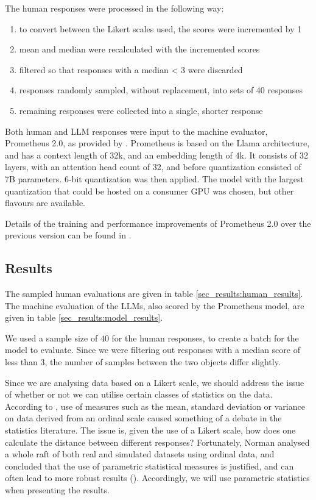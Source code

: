 \documentclass{article}
\begin{document}
The human responses were processed in the following way:

\begin{enumerate}
    \item to convert between the Likert scales used, the scores were incremented by 1
    \item mean and median were recalculated with the incremented scores
    \item filtered so that responses with a median < 3 were discarded
    \item responses randomly sampled, without replacement, into sets of 40 responses
    \item remaining responses were collected into a single, shorter response 
\end{enumerate}

Both human and LLM responses were input to the machine evaluator, Prometheus 2.0, as provided by \cite{prometheus_huggingface}. Prometheus is based on the Llama architecture, and has a context length of 32k, and an embedding length of 4k. It consists of 32 layers, with an attention head count of 32, and before quantization consisted of 7B parameters. 6-bit quantization was then applied. The model with the largest quantization that could be hosted on a consumer GPU was chosen, but other flavours are available.

Details of the training and performance improvements of Prometheus 2.0 over the previous version can be found in \cite{kim2024prometheus2opensource}.

\subsection{Results}
\label{sec:results}

The sampled human evaluations are given in table \ref{sec_results:human_results}.  The machine evaluation of the LLMs, also scored by the Prometheus model, are given in table \ref{sec_results:model_results}.

We used a sample size of $40$ for the human responses, to create a batch for the model to evaluate. Since we were filtering out responses with a median score of less than $3$, the number of samples between the two objects differ slightly. 

Since we are analysing data based on a Likert scale, we should address the issue of whether or not we can utilise certain classes of statistics on the data. According to \cite{Sullivan_2013}, use of measures such as the mean, standard deviation or variance on data derived from an ordinal scale caused something of a debate in the statistics literature. The issue is, given the use of a Likert scale, how does one calculate the distance between different responses? Fortunately, Norman analysed a whole raft of both real and simulated datasets using ordinal data, and concluded that the use of parametric statistical measures is justified, and can often lead to more robust results (\cite{norman2010likert}). Accordingly, we will use parametric statistics when presenting the results.   
\end{document}
